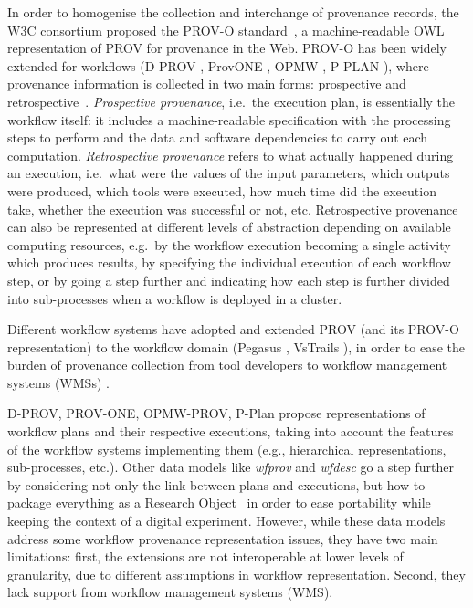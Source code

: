\documentclass[10pt,letterpaper]{article}
\begin{document}
In order to homogenise the collection and interchange of provenance records, the W3C consortium proposed the PROV-O standard~\cite{Lebo 2013}, a machine-readable OWL \cite{W3C OWL Working Group 2012} representation of PROV for provenance in the Web.
PROV-O has been widely extended for workflows (D-PROV \cite{Missier 2013}, ProvONE \cite{Cuevas-Vicenttín 2016}, OPMW \cite{Garijo 2011}, P-PLAN \cite{Garijo 2012}), where provenance information is collected in two main forms: prospective and retrospective~\cite{Freire 2008}. \emph{Prospective provenance}, i.e.~the execution plan, is essentially the workflow itself: it includes a machine-readable specification with the processing steps to perform and the data and software dependencies to carry out each computation.
\emph{Retrospective provenance} refers to what actually happened during an execution, i.e.~what were the values of the input parameters, which outputs were produced, which tools were executed, how much time did the execution take, whether the execution was successful or not, etc.
Retrospective provenance can also be represented at different levels of abstraction depending on available computing resources, e.g.~by the workflow execution becoming a single activity which produces results, by specifying the individual execution of each workflow step, or by going a step further and indicating how each step is further divided into sub-processes when a workflow is deployed in a cluster.

Different workflow systems have adopted and extended PROV (and its PROV-O representation) to the workflow domain (Pegasus \cite{Deelman 2005}, VsTrails \cite{Scheidegger 2008}), in order to ease the burden of provenance collection from tool developers to workflow management systems (WMSs) \cite{Atkinson 2017}.

D-PROV, PROV-ONE, OPMW-PROV, P-Plan propose representations of workflow plans and their respective executions, taking into account the features of the workflow systems implementing them (e.g., hierarchical representations, sub-processes, etc.).
Other data models like \emph{wfprov} and \emph{wfdesc}
\cite{Belhajjame 2015} go a step further by considering not only the link between plans and executions, but how to package everything as a Research Object~\cite{Bechhofer 2013} in order to ease portability while keeping the context of a digital experiment.
However, while these data models address some workflow provenance representation issues, they have two main limitations: first, the extensions are not interoperable at lower levels of granularity, due to different assumptions in workflow representation.
Second, they lack support from workflow management systems (WMS).
\end{document}
